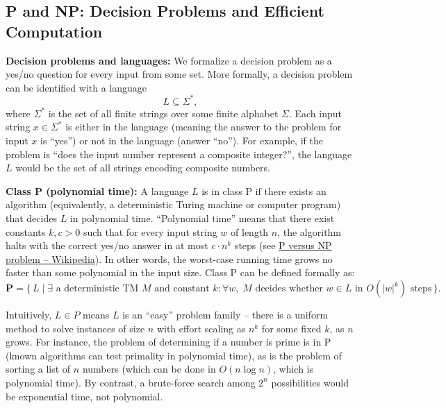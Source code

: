 \documentclass[11pt]{article}
\begin{document}
\subsection{P and NP: Decision Problems and Efficient Computation}
\textbf{Decision problems and languages:} We formalize a decision problem as a yes/no question for every input from some set. More formally, a decision problem can be identified with a language
\[
L \subseteq \Sigma^*,
\]
where \(\Sigma^*\) is the set of all finite strings over some finite alphabet \(\Sigma\). Each input string \(x \in \Sigma^*\) is either in the language (meaning the answer to the problem for input \(x\) is “yes”) or not in the language (answer “no”). For example, if the problem is “does the input number represent a composite integer?”, the language \(L\) would be the set of all strings encoding composite numbers.

\textbf{Class P (polynomial time):} A language \(L\) is in class P if there exists an algorithm (equivalently, a deterministic Turing machine or computer program) that decides \(L\) in polynomial time. “Polynomial time” means that there exist constants \(k, c > 0\) such that for every input string \(w\) of length \(n\), the algorithm halts with the correct yes/no answer in at most \(c \cdot n^k\) steps (see \href{https://en.wikipedia.org/wiki/P_versus_NP_problem}{P versus NP problem -- Wikipedia}). In other words, the worst-case running time grows no faster than some polynomial in the input size. Class P can be defined formally as:
\[
\mathbf{P} = \{\, L \mid \exists \text{ a deterministic TM } M \text{ and constant } k: \forall w,\; M \text{ decides whether } w\in L \text{ in } O(|w|^k) \text{ steps}\,\}.
\]

Intuitively, \(L \in P\) means \(L\) is an “easy” problem family -- there is a uniform method to solve instances of size \(n\) with effort scaling as \(n^k\) for some fixed \(k\), as \(n\) grows. For instance, the problem of determining if a number is prime is in P (known algorithms can test primality in polynomial time), as is the problem of sorting a list of \(n\) numbers (which can be done in \(O(n \log n)\), which is polynomial time). By contrast, a brute-force search among \(2^n\) possibilities would be exponential time, not polynomial.
\end{document}
